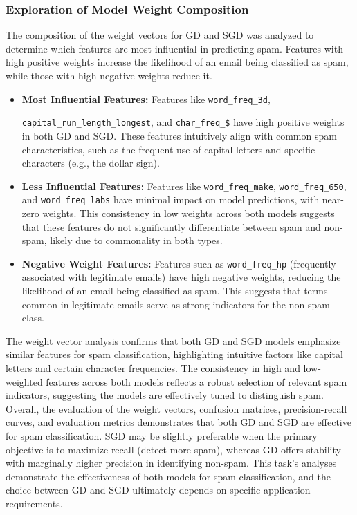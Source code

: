 \documentclass[a4paper,oneside,bibliography=totoc]{scrartcl}
\begin{document}
\subsubsection{Exploration of Model Weight Composition}
The composition of the weight vectors for GD and SGD was analyzed to determine which features are most influential in predicting spam. Features with high positive weights increase the likelihood of an email being classified as spam, while those with high negative weights reduce it.

\begin{itemize}
    \item \textbf{Most Influential Features:} Features like \texttt{word\_freq\_3d}, 
    
    \texttt{capital\_run\_length\_longest}, and \texttt{char\_freq\_\$} have high positive weights in both GD and SGD. These features intuitively align with common spam characteristics, such as the frequent use of capital letters and specific characters (e.g., the dollar sign).
    \item \textbf{Less Influential Features:} Features like \texttt{word\_freq\_make}, \texttt{word\_freq\_650}, and \texttt{word\_freq\_labs} have minimal impact on model predictions, with near-zero weights. This consistency in low weights across both models suggests that these features do not significantly differentiate between spam and non-spam, likely due to commonality in both types.
    \item \textbf{Negative Weight Features:} Features such as \texttt{word\_freq\_hp} (frequently associated with legitimate emails) have high negative weights, reducing the likelihood of an email being classified as spam. This suggests that terms common in legitimate emails serve as strong indicators for the non-spam class.
\end{itemize}


The weight vector analysis confirms that both GD and SGD models emphasize similar features for spam classification, highlighting intuitive factors like capital letters and certain character frequencies. The consistency in high and low-weighted features across both models reflects a robust selection of relevant spam indicators, suggesting the models are effectively tuned to distinguish spam. Overall, the evaluation of the weight vectors, confusion matrices, precision-recall curves, and evaluation metrics demonstrates that both GD and SGD are effective for spam classification. SGD may be slightly preferable when the primary objective is to maximize recall (detect more spam), whereas GD offers stability with marginally higher precision in identifying non-spam. This task’s analyses demonstrate the effectiveness of both models for spam classification, and the choice between GD and SGD ultimately depends on specific application requirements.
\end{document}
